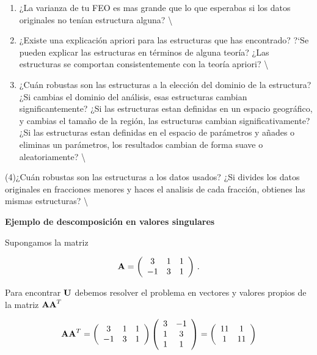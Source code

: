 \documentclass[
]{agujournal2019}
\begin{document}
\begin{enumerate}
\def\labelenumi{(\arabic{enumi})}
\item
  ¿La varianza de tu FEO es mas grande que lo que esperabas si los datos
  originales no tenían estructura alguna? \textbackslash{}
\item
  ¿Existe una explicación apriori para las estructuras que has
  encontrado? ?{}`Se pueden explicar las estructuras en términos de
  alguna teoría? ¿Las estructuras se comportan consistentemente con la
  teoría apriori? \textbackslash{}
\item
  ¿Cuán robustas son las estructuras a la elección del dominio de la
  estructura? ¿Si cambias el dominio del análisis, esas estructuras
  cambian significantemente? ¿Si las estructuras estan definidas en un
  espacio geográfico, y cambias el tamaño de la región, las estructuras
  cambian significativamente? ¿Si las estructuras estan definidas en el
  espacio de parámetros y añades o eliminas un parámetros, los
  resultados cambian de forma suave o aleatoriamente? \textbackslash{}
\end{enumerate}

(4)¿Cuán robustas son las estructuras a los datos usados? ¿Si divides
los datos originales en fracciones menores y haces el analisis de cada
fracción, obtienes las mismas estructuras? \textbackslash{}

\vspace{0.5cm}

\textbf{Ejemplo de descomposición en valores singulares}

Supongamos la matriz

\[{\textbf A}=\left(\begin{array}{ccc}
  3 & 1 & 1\\
  -1 & 3 & 1\\
      \end{array}\right)\,.\]

Para encontrar \({\textbf U}\) debemos resolver el problema en vectores
y valores propios de la matriz \({\textbf A}{\textbf A}^T\)

\[{\textbf A}{\textbf A}^T=\left(\begin{array}{ccc}
  3 & 1 & 1\\
  -1 & 3 & 1\\
      \end{array}\right)
      \left(\begin{array}{ccc}
  3 & -1 \\
  1 & 3 \\
  1 & 1 \\
      \end{array}\right)=\left(\begin{array}{cc}
  11 & 1 \\
  1 & 11 \\
      \end{array}\right)\]
\end{document}
